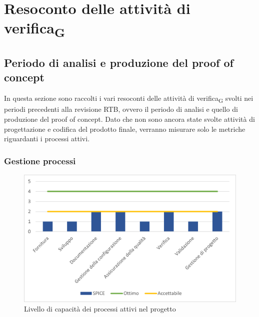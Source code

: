 \appendix
\section{Resoconto delle attività di verifica\textsubscript{G}}
\subsection{Periodo di analisi e produzione del proof of concept}
In questa sezione sono raccolti i vari resoconti delle attività di verifica\textsubscript{G} svolti nei periodi precedenti alla revisione RTB, ovvero il periodo di analisi e quello di produzione del proof of concept.
Dato che non sono ancora state svolte attività di progettazione e codifica del prodotto finale, verranno misurare solo le metriche riguardanti i processi attivi.
\subsubsection{Gestione processi}
\begin{figure}[H]
	\centering
	\includegraphics[scale=1.1]{img/SPICE.png}
	\caption{Livello di capacità dei processi attivi nel progetto}
\end{figure}
